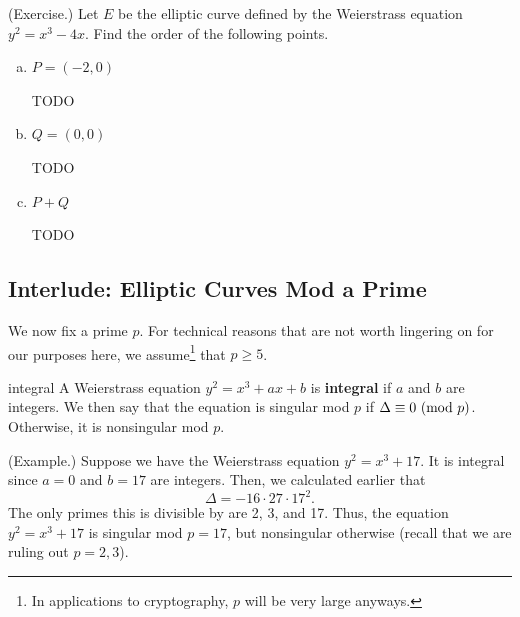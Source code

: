 \documentclass[letterpaper]{article}
\begin{document}
\begin{mdframed}
    (Exercise.) Let $E$ be the elliptic curve defined by the Weierstrass equation $y^2 = x^3 - 4x$. Find the order of the following points. 
    \begin{enumerate}[(a)]
        \item $P = (-2, 0)$
        \begin{mdframed}
            TODO 
        \end{mdframed}
        \item $Q = (0, 0)$
        \begin{mdframed}
            TODO 
        \end{mdframed}
        \item $P + Q$
        \begin{mdframed}
            TODO 
        \end{mdframed}
    \end{enumerate}
\end{mdframed}


\subsection{Interlude: Elliptic Curves Mod a Prime}
We now fix a prime $p$. For technical reasons that are not worth lingering on for our purposes here, we assume\footnote{In applications to cryptography, $p$ will be very large anyways.} that $p \geq 5$. 

\begin{definition}{integral}{}
    A Weierstrass equation $y^2 = x^3 + ax + b$ is \textbf{integral} if $a$ and $b$ are integers. We then say that the equation is singular mod $p$ if $\Delta \equiv 0 \ (\mathrm{mod}\ p)$. Otherwise, it is nonsingular mod $p$. 
\end{definition}

\begin{mdframed}
    (Example.) Suppose we have the Weierstrass equation $y^2 = x^3 + 17$. It is integral since $a = 0$ and $b = 17$ are integers. Then, we calculated earlier that \[\Delta = -16 \cdot 27 \cdot 17^2.\] The only primes this is divisible by are 2, 3, and 17. Thus, the equation $y^2 = x^3 + 17$ is singular mod $p = 17$, but nonsingular otherwise (recall that we are ruling out $p = 2, 3$).
\end{mdframed}
\end{document}
